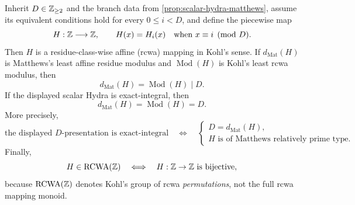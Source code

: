 \begin{proposition}
\label{prop:scalar-hydra-rcwa}
Inherit $D\in\mathbb Z_{\geq2}$ and the branch data from
\cref{prop:scalar-hydra-matthews}, assume its equivalent conditions hold for
every $0\leq i<D$, and define the piecewise map
\[
 H:\mathbb Z\longrightarrow\mathbb Z,
 \qquad H(x)=H_i(x)\quad\text{when }x\equiv i\pmod D.
\]
Then $H$ is a residue-class-wise affine (rcwa) mapping in Kohl's sense.  If
$d_{\mathrm{Mat}}(H)$ is Matthews's least affine residue modulus and
$\operatorname{Mod}(H)$ is Kohl's least rcwa modulus, then
\begin{equation}
\label{eq:rcwa-modulus-divides-hydra-modulus}
 d_{\mathrm{Mat}}(H)=\operatorname{Mod}(H)\mid D.
\end{equation}
If the displayed scalar Hydra is exact-integral, then
\begin{equation}
\label{eq:exact-integral-minimal-modulus}
 d_{\mathrm{Mat}}(H)=\operatorname{Mod}(H)=D.
\end{equation}
More precisely,
\begin{equation}
\label{eq:scalar-exact-integral-minimal-relative-type}
 \text{the displayed $D$-presentation is exact-integral}
 \quad\Longleftrightarrow\quad
 \left\{
 \begin{array}{l}
  D=d_{\mathrm{Mat}}(H),\\
  H\text{ is of Matthews relatively prime type}.
 \end{array}
 \right.
\end{equation}
Finally,
\[
 H\in\operatorname{RCWA}(\mathbb Z)
 \quad\Longleftrightarrow\quad
 H:\mathbb Z\to\mathbb Z\text{ is bijective},
\]
because $\operatorname{RCWA}(\mathbb Z)$ denotes Kohl's group of rcwa
\emph{permutations}, not the full rcwa mapping monoid.
\end{proposition}


